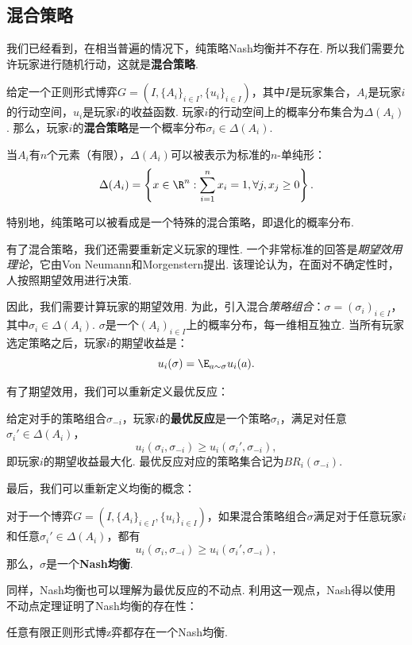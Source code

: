\subsection{混合策略}
我们已经看到，在相当普遍的情况下，纯策略Nash均衡并不存在. 所以我们需要允许玩家进行随机行动，这就是\textbf{混合策略}. 

\begin{definition}[混合策略]
给定一个正则形式博弈$G=(I,\{A_i\}_{i\in I},\{u_i\}_{i\in I})$，其中$I$是玩家集合，$A_i$是玩家$i$的行动空间，$u_i$是玩家$i$的收益函数. 玩家$i$的行动空间上的概率分布集合为$\Delta(A_i)$. 那么，玩家$i$的\textbf{混合策略}是一个概率分布$\sigma_i\in\Delta(A_i)$. 
\end{definition}

当$A_i$有$n$个元素（有限），$\Delta(A_i)$可以被表示为标准的$n$-单纯形：
    \[\Delta(A_i)=\left\{x\in\R^n:\sum_{i=1}^n x_i=1,\forall j,x_j\geq 0\right\}.\]

特别地，纯策略可以被看成是一个特殊的混合策略，即退化的概率分布.

有了混合策略，我们还需要重新定义玩家的理性. 一个非常标准的回答是\emph{期望效用理论}，它由Von Neumann和Morgenstern提出. 该理论认为，在面对不确定性时，人按照期望效用进行决策. 


因此，我们需要计算玩家的期望效用. 为此，引入混合\emph{策略组合}：$\sigma=(\sigma_i)_{i\in I}$，其中$\sigma_i\in\Delta(A_i)$. $\sigma$是一个$(A_i)_{i\in I}$上的概率分布，每一维相互独立. 当所有玩家选定策略之后，玩家$i$的期望收益是：
    \[u_i(\sigma)=\E_{a\sim\sigma} u_i(a).\]

有了期望效用，我们可以重新定义最优反应：

\begin{definition}[最优反应]
给定对手的策略组合$\sigma_{-i}$，玩家$i$的\textbf{最优反应}是一个策略$\sigma_i$，满足对任意$\sigma_i'\in \Delta(A_i)$，
    \[u_i(\sigma_i,\sigma_{-i})\geq u_i(\sigma_i',\sigma_{-i}),\]
即玩家$i$的期望收益最大化. 最优反应对应的策略集合记为$BR_i(\sigma_{-i})$.
\end{definition}

最后，我们可以重新定义均衡的概念：

\begin{definition}[Nash均衡]
对于一个博弈$G=(I,\{A_i\}_{i\in I},\{u_i\}_{i\in I})$，如果混合策略组合$\sigma$满足对于任意玩家$i$和任意$\sigma_i'\in \Delta(A_i)$，都有
\[u_i(\sigma_i,\sigma_{-i})\geq u_i(\sigma_i',\sigma_{-i}),\]
那么，$\sigma$是一个\textbf{Nash均衡}.
\end{definition}

同样，Nash均衡也可以理解为最优反应的不动点. 利用这一观点，Nash得以使用不动点定理证明了Nash均衡的存在性：
\begin{theorem}[Nash均衡存在性定理]
任意有限正则形式博z弈都存在一个Nash均衡.
\end{theorem}


